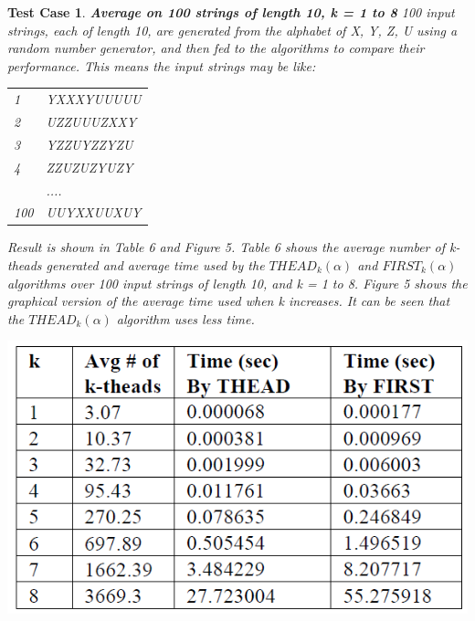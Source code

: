 \documentclass{sig-alternate-05-2015}
\newtheorem{TestCase}{Test Case}
\begin{document}
\begin{TestCase}
\textbf{Average on 100 strings of length 10, k
= 1 to 8}
100 input strings, each of length 10, are generated from the
alphabet of {X, Y, Z, U} using a random number generator,
and then fed to the algorithms to compare their performance.
This means the input strings may be like:
\begin{tabular}{ll}
1   & YXXXYUUUUU                                                                                                   \\
2   & UZZUUUZXXY                                                                                                  \\
3   & YZZUYZZYZU                                                                                                \\
4   & ZZUZUZYUZY                                                                                                \\
    & ....                                                                                                \\
100 &UUYXXUUXUY \\
\end{tabular}

Result is shown in Table 6 and Figure 5. Table 6 shows
the average number of k-theads generated and average time
used by the $THEAD_k(\alpha)$ and $FIRST_k(\alpha)$ algorithms over
100 input strings of length 10, and k = 1 to 8. Figure 5
shows the graphical version of the average time used when
k increases. It can be seen that the $THEAD_k(\alpha)$ algorithm
uses less time.

\begin{table}[h]
\centering
\includegraphics[scale=0.5]{table6.PNG}
\caption{Average number of generated k-theads and time
spent on 100 random strings of length 10, for k = 1 to 8}
\label{table:6}
\end{table}


\end{TestCase}
\end{document}
